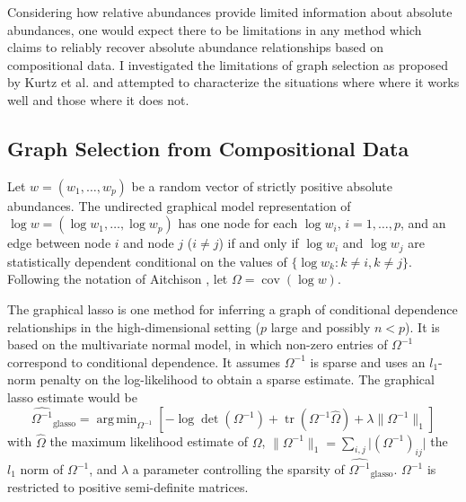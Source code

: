 \documentclass[12pt]{article}
\newcommand{\cov}{\operatorname{cov}}
\DeclareMathOperator*{\argmin}{arg\,min}
\DeclareMathOperator{\tr}{tr}
\begin{document}
Considering how relative abundances provide limited information about absolute abundances, one would expect there to be limitations in any method which claims to reliably recover absolute abundance relationships based on compositional data. I investigated the limitations of graph selection as proposed by Kurtz et al. \citeyear{kurtz} and attempted to characterize the situations where where it works well and those where it does not.

\subsection*{Graph Selection from Compositional Data}

Let $w = (w_1, \dots, w_p)$ be a random vector of strictly positive absolute abundances. The undirected graphical model representation of $\log w = (\log w_1, \dots, \log w_p)$ has one node for each $\log w_i$, $i = 1, \dots, p$, and an edge between node $i$ and node $j$ ($i \ne j$) if and only if $\log w_i$ and $\log w_j$ are statistically dependent conditional on the values of $\{\log w_k : k \ne i, k \ne j\}$. Following the notation of Aitchison \citeyear{aitchison}, let $\Omega = \cov(\log w)$.

The graphical lasso \cite{friedmanjer} is one method for inferring a graph of conditional dependence relationships in the high-dimensional setting ($p$ large and possibly $n < p$). It is based on the multivariate normal model, in which non-zero entries of $\Omega^{-1}$ correspond to conditional dependence. It assumes $\Omega^{-1}$ is sparse and uses an $l_1$-norm penalty on the log-likelihood to obtain a sparse estimate. The graphical lasso estimate would be
\begin{equation}
\label{e:glasso}
\widehat{\Omega^{-1}}_{\text{glasso}} = \argmin_{\Omega^{-1}} \left[ -\log \det(\Omega^{-1}) + \tr(\Omega^{-1} \hat{\Omega}) + \lambda \lVert \Omega^{-1} \rVert_1 \right]
\end{equation}
with $\hat{\Omega}$ the maximum likelihood estimate of $\Omega$, $\lVert \Omega^{-1} \rVert_1 = \sum_{i,j} \lvert (\Omega^{-1})_{ij} \rvert$ the $l_1$ norm of $\Omega^{-1}$, and $\lambda$ a parameter controlling the sparsity of $\widehat{\Omega^{-1}}_{\text{glasso}}$. $\Omega^{-1}$ is restricted to positive semi-definite matrices.
\end{document}
